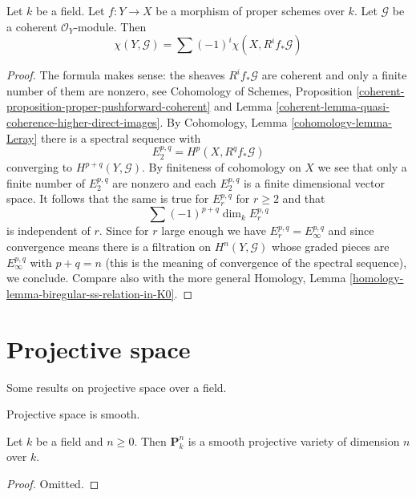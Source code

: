 \begin{lemma}
\label{lemma-euler-characteristic-morphism}
Let $k$ be a field. Let $f : Y \to X$ be a morphism of proper schemes over
$k$. Let $\mathcal{G}$ be a coherent $\mathcal{O}_Y$-module. Then
$$
\chi(Y, \mathcal{G}) = \sum (-1)^i \chi(X, R^if_*\mathcal{G})
$$
\end{lemma}

\begin{proof}
The formula makes sense: the sheaves $R^if_*\mathcal{G}$ are coherent
and only a finite number of them are nonzero, see
Cohomology of Schemes,
Proposition \ref{coherent-proposition-proper-pushforward-coherent} and
Lemma \ref{coherent-lemma-quasi-coherence-higher-direct-images}.
By Cohomology, Lemma \ref{cohomology-lemma-Leray} there is a spectral
sequence with
$$
E_2^{p, q} = H^p(X, R^qf_*\mathcal{G})
$$
converging to $H^{p + q}(Y, \mathcal{G})$. By finiteness of cohomology
on $X$ we see that only a finite number of $E_2^{p, q}$ are nonzero
and each $E_2^{p, q}$ is a finite dimensional vector space. It follows
that the same is true for $E_r^{p, q}$ for $r \geq 2$ and that
$$
\sum (-1)^{p + q} \dim_k E_r^{p, q}
$$
is independent of $r$. Since for $r$ large enough we have
$E_r^{p, q} = E_\infty^{p, q}$ and since convergence means there
is a filtration on $H^n(Y, \mathcal{G})$ whose graded pieces are
$E_\infty^{p, q}$ with $p + q = n$ (this is the meaning of convergence
of the spectral sequence), we conclude.
Compare also with the more general
Homology, Lemma \ref{homology-lemma-biregular-ss-relation-in-K0}.
\end{proof}







\section{Projective space}
\label{section-projective-space}

\noindent
Some results on projective space over a field.

\begin{lemma}
\label{lemma-projective-space-smooth}
\begin{slogan}
Projective space is smooth.
\end{slogan}
Let $k$ be a field and $n \geq 0$. Then $\mathbf{P}^n_k$ is a
smooth projective variety of dimension $n$ over $k$.
\end{lemma}

\begin{proof}
Omitted.
\end{proof}

